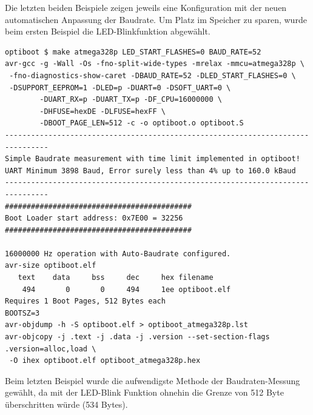 Die letzten beiden Beispiele zeigen jeweils eine Konfiguration mit der neuen automatischen Anpassung der Baudrate.
Um Platz im Speicher zu sparen, wurde beim ersten Beispiel die LED-Blinkfunktion abgewählt.

\begin{verbatim}
optiboot $ make atmega328p LED_START_FLASHES=0 BAUD_RATE=52
avr-gcc -g -Wall -Os -fno-split-wide-types -mrelax -mmcu=atmega328p \
 -fno-diagnostics-show-caret -DBAUD_RATE=52 -DLED_START_FLASHES=0 \
 -DSUPPORT_EEPROM=1 -DLED=p -DUART=0 -DSOFT_UART=0 \
        -DUART_RX=p -DUART_TX=p -DF_CPU=16000000 \
        -DHFUSE=hexDE -DLFUSE=hexFF \
        -DBOOT_PAGE_LEN=512 -c -o optiboot.o optiboot.S
--------------------------------------------------------------------------------
Simple Baudrate measurement with time limit implemented in optiboot!
UART Minimum 3898 Baud, Error surely less than 4% up to 160.0 kBaud
--------------------------------------------------------------------------------
###########################################
Boot Loader start address: 0x7E00 = 32256
###########################################

16000000 Hz operation with Auto-Baudrate configured.
avr-size optiboot.elf
   text	   data	    bss	    dec	    hex	filename
    494	      0	      0	    494	    1ee	optiboot.elf
Requires 1 Boot Pages, 512 Bytes each
BOOTSZ=3
avr-objdump -h -S optiboot.elf > optiboot_atmega328p.lst
avr-objcopy -j .text -j .data -j .version --set-section-flags .version=alloc,load \
 -O ihex optiboot.elf optiboot_atmega328p.hex
\end{verbatim}

Beim letzten Beispiel wurde die aufwendigste Methode der Baudraten-Messung
gewählt, da mit der LED-Blink Funktion ohnehin die Grenze von 512 Byte
überschritten würde (534 Bytes).

